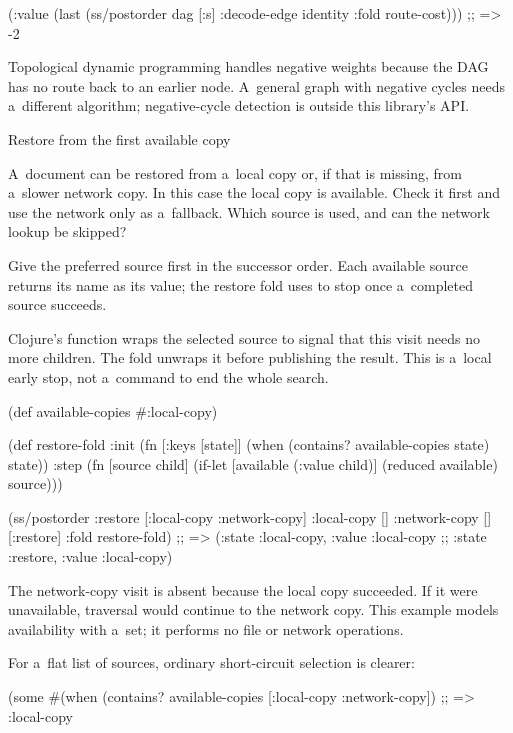 {{{(:value (last (ss/postorder dag [:s]
                                 {:decode-edge identity
                                  :fold route-cost})))
;; => -2
\endtt

Topological dynamic programming handles negative weights because the DAG
has no route back to an earlier node. A~general graph with negative cycles
needs a~different algorithm; negative-cycle detection is outside this
library's API.

\secc Restore from the first available copy

 A~document can be restored from a~local copy or,
if that is missing, from a~slower network copy. In this case the local copy
is available. Check it first and use the network only as a~fallback.
Which source is used, and can the network lookup be skipped?

\smallskip
{} Give the preferred source first in the successor
order. Each available source returns its name as its value; the restore
fold uses  to stop once a~completed source succeeds.

Clojure's  function wraps the selected source to signal that
this visit needs no more children. The fold unwraps it before publishing
the result. This is a~local early stop, not a~command to end the whole search.

\begtt {}
(def available-copies #{:local-copy})

(def restore-fold
  {:init (fn [{:keys [state]}]
           (when (contains? available-copies state) state))
   :step (fn [source child]
           (if-let [available (:value child)]
             (reduced available)
             source))})

(ss/postorder {:restore [:local-copy :network-copy]
               :local-copy []
               :network-copy []}
              [:restore]
              {:fold restore-fold})
;; => ({:state :local-copy, :value :local-copy}
;;     {:state :restore, :value :local-copy})
\endtt

The network-copy visit is absent because the local copy succeeded. If it
were unavailable, traversal would continue to the network copy.
This example models availability with a~set; it performs no file or network
operations.

\smallskip
{} For a~flat list of sources, ordinary
short-circuit selection is clearer:

\begtt {}
(some #(when (contains? available-copies %
      [:local-copy :network-copy])
;; => :local-copy
\endtt

}}}
